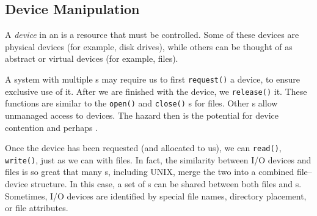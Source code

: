 \subsection{Device Manipulation}\label{subsec:Device_Manipulation}
\begin{definition}[Device]\label{def:Device}
  A \emph{device} in an  is a resource that must be controlled.
  Some of these devices are physical devices (for example, disk drives), while others can be thought of as abstract or virtual devices (for example, files).
\end{definition}

A system with multiple s may require us to first \texttt{request()} a device, to ensure exclusive use of it.
After we are finished with the device, we \texttt{release()} it.
These functions are similar to the \texttt{open()} and \texttt{close()} s for files.
Other s allow unmanaged access to devices.
The hazard then is the potential for device contention and perhaps .

Once the device has been requested (and allocated to us), we can \texttt{read()}, \texttt{write()}, just as we can with files.
In fact, the similarity between I/O devices and files is so great that many s, including UNIX, merge the two into a combined file–device structure.
In this case, a set of s can be shared between both files and s.
Sometimes, I/O devices are identified by special file names, directory placement, or file attributes.

